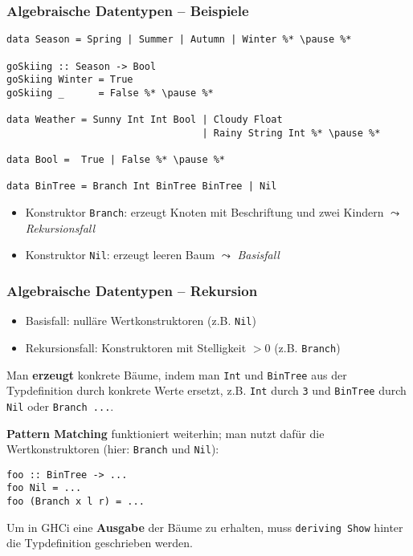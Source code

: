 \documentclass{beamer}
\begin{document}
\begin{frame}[fragile] \frametitle{Algebraische Datentypen -- Beispiele}
	
	\begin{lstlisting}[style=bg]
data Season = Spring | Summer | Autumn | Winter %* \pause %*

goSkiing :: Season -> Bool
goSkiing Winter = True
goSkiing _      = False %* \pause %*

data Weather = Sunny Int Int Bool | Cloudy Float 
                                  | Rainy String Int %* \pause %*
                           
data Bool =  True | False %* \pause %*

data BinTree = Branch Int BinTree BinTree | Nil
	\end{lstlisting}
	\begin{itemize}
		\item Konstruktor \texttt{Branch}: erzeugt Knoten mit Beschriftung und zwei Kindern  
		\hfill $\leadsto$ \textit{Rekursionsfall}
		\item Konstruktor \texttt{Nil}: erzeugt leeren Baum \hfill $\leadsto$ \textit{Basisfall}
	\end{itemize}
\end{frame}

\begin{frame}[fragile] \frametitle{Algebraische Datentypen -- Rekursion}
	\small
	\begin{itemize}
		\item Basisfall: nulläre Wertkonstruktoren (z.B. \texttt{Nil})
		\item Rekursionsfall: Konstruktoren mit Stelligkeit $>0$ (z.B. \texttt{Branch})
	\end{itemize}
	\pause
	
	Man \textbf{erzeugt} konkrete Bäume, indem man \texttt{Int} und \texttt{BinTree} aus der Typdefinition durch konkrete Werte ersetzt, z.B. \texttt{Int} durch \texttt{3} und \texttt{BinTree} durch \texttt{Nil} oder \texttt{Branch ...}.
	\pause
	
	\textbf{Pattern Matching} funktioniert weiterhin; man nutzt dafür die Wertkonstruktoren (hier: \texttt{Branch} und \texttt{Nil}):
	\begin{lstlisting}[style=bg]
foo :: BinTree -> ...
foo Nil = ...
foo (Branch x l r) = ...
	\end{lstlisting}
	\pause

	Um in GHCi eine \textbf{Ausgabe} der Bäume zu erhalten, muss \texttt{deriving Show} hinter die Typdefinition geschrieben werden. 
\end{frame}
\end{document}
